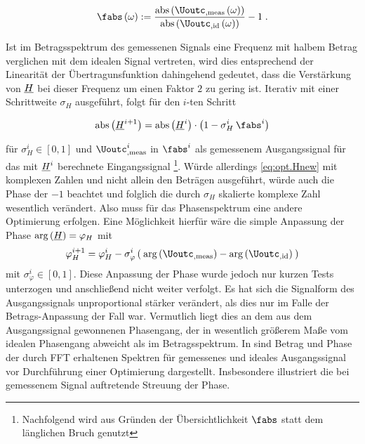 \documentclass[../Report.tex]{subfiles}
\begin{document}
\begin{align}
\label{eq:opt.ratio}
	\fabs \ofomega :=  
				\frac{\mathrm{abs} \left( \Uoutc_{, \mathrm{meas}} \ofomega \right)}{\mathrm{abs} \left(\Uoutc_{, \mathrm{id}} \ofomega \right)} -1
				\; .
\end{align} 

Ist im Betragsspektrum des gemessenen Signals eine Frequenz mit halbem Betrag verglichen mit dem idealen Signal vertreten, wird dies entsprechend der Linearität der Übertragunsfunktion dahingehend gedeutet, dass die Verstärkung von $\underline{H}$ bei dieser Frequenz um einen Faktor $2$ zu gering ist.
Iterativ mit einer Schrittweite $\sigma_H$ ausgeführt, folgt für den $i$-ten Schritt

\begin{align}
\label{eq:opt.Hnew}
	\mathrm{abs} \left( \Hcompl^{i+1} \right)
		=\mathrm{abs} \left( \Hcompl^{i}  \right) \cdot
		\left( 1 - \sigma_H^i \: \fabs^{i}	\right)					 
\end{align}

für $\sigma_H^i \in \left[ 0 , 1 \right]$ und $\Uoutc_{, \mathrm{meas}}^{i}$ in $\fabs^{i}$ als gemessenem Ausgangssignal für das mit $\underline{H}^{i}$ berechnete Eingangssignal \footnote{Nachfolgend wird aus Gründen der Übersichtlichkeit $\fabs$ statt dem länglichen Bruch genutzt}.
Würde allerdings \eqref{eq:opt.Hnew} mit komplexen Zahlen und nicht allein den Beträgen ausgeführt, würde auch die Phase der $-1$ beachtet und folglich die durch $\sigma_H$ skalierte komplexe Zahl wesentlich verändert. Also muss für das Phasenspektrum eine andere Optimierung erfolgen.
Eine Möglichkeit hierfür wäre die simple Anpassung der Phase $ \mathrm{arg} \left( \underline{H} \right) = \varphi_H$ mit 
\begin{align}
\label{eq:opt.HnewPhase}
	\varphi_H^{i+1} = \varphi_H^{i} - \sigma_{\varphi}^{i} 
			\left( \: \mathrm{arg} \left( \Uoutc_{, \mathrm{meas}} \right)
					- \mathrm{arg} \left( \Uoutc_{, \mathrm{id}} \right) \: \right)
\end{align}
mit $\sigma_{\varphi}^i \in \left[ 0 , 1 \right]$. Diese Anpassung der Phase wurde jedoch nur kurzen Tests unterzogen und anschließend nicht weiter verfolgt. Es hat sich die Signalform des Ausgangssignals unproportional stärker verändert, als dies nur im Falle der Betrags-Anpassung der Fall war. Vermutlich %
liegt dies an dem aus dem Ausgangssignal gewonnenen Phasengang, der in wesentlich größerem Maße vom idealen Phasengang abweicht als im Betragsspektrum. In  sind Betrag und Phase der durch FFT erhaltenen Spektren für gemessenes und ideales Ausgangssignal vor Durchführung einer Optimierung dargestellt. Insbesondere illustriert  die bei gemessenem Signal auftretende Streuung der Phase. 
\\
\end{document}
